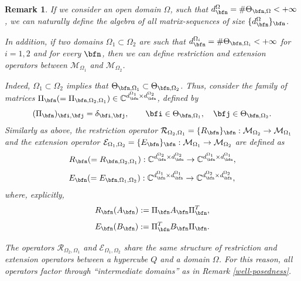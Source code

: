 \documentclass{amsart}
\newtheorem{rem}[thm]{Remark}
\begin{document}
\begin{rem}\label{rem_restr_btw_domains}
    If we consider an open domain $\Omega$, such that $d_\bfn^{\Omega}=\#\Theta_{\bfn,\Omega}<+\infty$, we can naturally define the algebra of all matrix-sequences of size $\{d_\bfn^{\Omega}\}_\bfn$.
    
    In addition, if two domains $\Omega_1\subset\Omega_2$ are such that $d_\bfn^{\Omega_i}=\#\Theta_{\bfn,\Omega_i}<+\infty$ for $i=1,2$ and for every $\bfn$, then we can define restriction and extension operators between $\mathcal{M}_{\Omega_1}$ and $\mathcal{M}_{\Omega_2}$. 
    
    Indeed, $\Omega_1\subset\Omega_2$ implies that $\Theta_{\bfn,\Omega_1}\subset\Theta_{\bfn,\Omega_2}$. Thus, consider the family of matrices $\Pi_{\bfn}(=\Pi_{\bfn,\Omega_2,\Omega_1})\in\mathbb{C}^{d_{\bfn}^{\Omega_1}\times d_{\bfn}^{\Omega_2}}$, defined by
\begin{equation*}
    (\Pi_{\bfn})_{\bfi,\bfj}=\delta_{\bfi,\bfj},\qquad\bfi\in\Theta_{\bfn,\Omega_1},\quad \bfj\in\Theta_{\bfn,\Omega_2}.
\end{equation*}
Similarly as above, the restriction operator $\mathcal{R}_{\Omega_2,\Omega_1}=\{R_{\bfn}\}_\bfn:\mathcal{M}_{\Omega_2}\to\mathcal{M}_{\Omega_1}$ and the extension operator $\mathcal{E}_{\Omega_1,\Omega_2}=\{E_{\bfn}\}_\bfn:\mathcal{M}_{\Omega_1}\to\mathcal{M}_{\Omega_2}$ are defined as 
\begin{equation*}
	R_{\bfn}(=R_{\bfn,\Omega_2,\Omega_1}):\mathbb{C}^{d_{\bfn}^{\Omega_2}\times d_{\bfn}^{\Omega_2}}\to\mathbb{C}^{d_{\bfn}^{\Omega_1}\times d_{\bfn}^{\Omega_1}},
\end{equation*}
\begin{equation*}
	E_{\bfn}(=E_{\bfn,\Omega_1,\Omega_2}):\mathbb{C}^{d_{\bfn}^{\Omega_1}\times d_{\bfn}^{\Omega_1}}\to\mathbb{C}^{d_{\bfn}^{\Omega_2}\times d_{\bfn}^{\Omega_2}},
\end{equation*}
where, explicitly,
\begin{equation*}
	R_{\bfn}(A_{\bfn}):=\Pi_{\bfn}A_{\bfn}\Pi_{\bfn}^T,
\end{equation*}
\begin{equation*}
	E_{\bfn}(B_{\bfn}):=\Pi_{\bfn}^T B_{\bfn}\Pi_{\bfn}. 
\end{equation*}

The operators $\mathcal{R}_{\Omega_2,\Omega_1}$ and $\mathcal{E}_{\Omega_1,\Omega_2}$ share the same structure of restriction and extension operators between a hypercube $Q$ and a domain $\Omega$. For this reason, all operators factor through ``intermediate domains'' as in Remark \ref{well-posedness}.


\end{rem}
\end{document}
